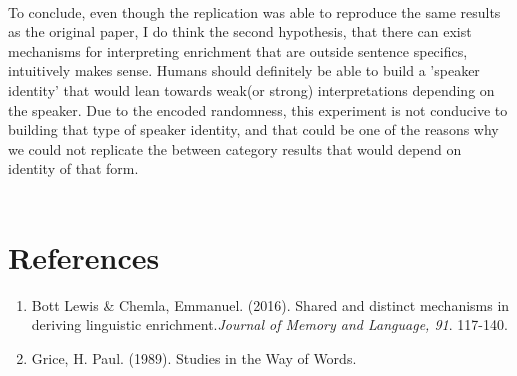 \documentclass[]{article}
\begin{document}
\\
To conclude, even though the replication was able to reproduce the same results as the original paper, I do think the second hypothesis, that there can exist mechanisms for interpreting enrichment that are outside sentence specifics, intuitively makes sense. Humans should definitely be able to build a 'speaker identity' that would lean towards weak(or strong) interpretations depending on the speaker. Due to the encoded randomness, this experiment is not conducive to building that type of speaker identity, and that could be one of the reasons why we could not replicate the between category results that would depend on identity of that form. \\
\\
\pagebreak
\section*{References}
 \begin{enumerate}
 \item Bott Lewis \& Chemla, Emmanuel. (2016). Shared and distinct mechanisms in deriving linguistic enrichment.\textit{Journal of Memory and Language, 91}. 117-140.
 \item Grice, H. Paul. (1989). Studies in the Way of Words.
\end{enumerate} 
\end{document}
